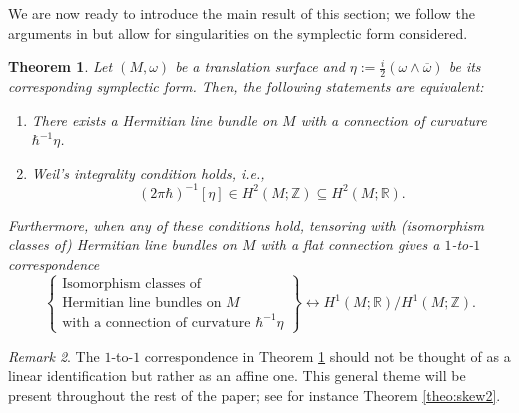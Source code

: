 \documentclass{amsart}
\newtheorem{theorem}{Theorem}[section]
\theoremstyle{definition}
\theoremstyle{remark}
\newtheorem{remark}[theorem]{Remark}
\numberwithin{equation}{section}
\newcommand{\<}{{\langle}}
\renewcommand{\>}{{\rangle}}
\begin{document}
We are now ready to introduce the main result of this section; we follow the arguments in \cite[Proposition 8.3.1]{quant} but allow for singularities on the symplectic form considered.

\begin{theorem}
\label{theo:prequant}
Let $(M,\omega)$ be a translation surface and $\eta := \frac{i}{2}(\omega \wedge\overline{\omega})$ be its corresponding symplectic form. Then, the following statements are equivalent:
\begin{enumerate}
    \item There exists a Hermitian line bundle on $M$ with a connection of curvature $\hbar^{-1} \eta$.
    \item Weil's integrality condition holds, i.e.,
    \begin{equation}\label{eq:weil}
    (2\pi\hbar)^{-1}[\eta] \in H^2(M;\mathbb{Z}) \subseteq H^2(M;\mathbb{R}).
    \end{equation}
\end{enumerate}
Furthermore, when any of these conditions hold, tensoring with (isomorphism classes of) Hermitian line bundles on $M$ with a flat connection gives a $1$-to-$1$ correspondence
 \[
    \left\lbrace \begin{array}{c}
         \text{Isomorphism classes of} \\
         \text{Hermitian line bundles on $M$} \\
         \text{with a connection of curvature $\hbar^{-1} \eta$}
    \end{array}
    \right\rbrace \longleftrightarrow H^1(M;\mathbb{R})/H^1(M;\mathbb{Z}).
\]
\end{theorem}

\begin{remark}\label{rem:affine}
    The $1$-to-$1$ correspondence in Theorem \ref{theo:prequant} should not be thought of as a linear identification but rather as an affine one. This general theme will be present throughout the rest of the paper; see for instance Theorem \ref{theo:skew2}.
\end{remark}
\end{document}
